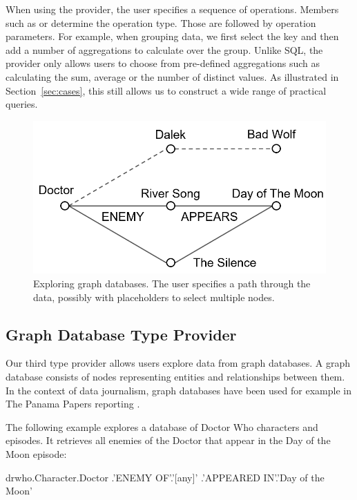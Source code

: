 \documentclass[manuscript,review,anonymous]{acmart}
\begin{document}
When using the provider, the user specifies a sequence of operations. Members such as
 or 
determine the operation type. Those are followed by operation parameters. For example, when grouping
data, we first select the key and then add a number of aggregations to calculate over the group.
Unlike SQL, the provider only allows users to choose from pre-defined aggregations such as
calculating the sum, average or the number of distinct values. As illustrated in
Section~\ref{sec:cases}, this still allows us to construct a wide range of practical queries.


\begin{figure}
\centering
\includegraphics[scale=0.28]{figures/graphtp}
\vspace{0.5em}
\caption{Exploring graph databases. The user specifies a path through the data, possibly with
  placeholders to select multiple nodes.}
\label{fig:graphtp}
\end{figure}

\subsection{Graph Database Type Provider}
Our third type provider allows users explore data from graph databases. A graph database
consists of nodes representing entities and relationships between them. In the context of
data journalism, graph databases have been used for example in The Panama Papers reporting \cite{panama}.

The following example explores a database of Doctor Who characters and episodes. It retrieves
all enemies of the Doctor that appear in the Day of the Moon episode:

\begin{thegamma}
drwho.Character.Doctor
  .'ENEMY OF'.'[any]'
  .'APPEARED IN'.'Day of the Moon'
\end{thegamma}
\end{document}

